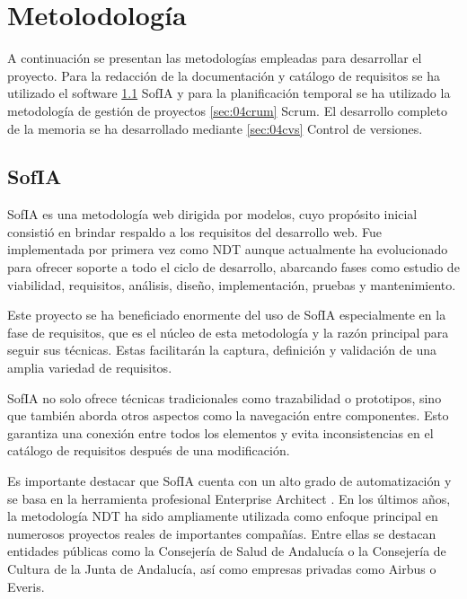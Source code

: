 \chapter{Metolodología}\label{cap:04metodologia}

A continuación se presentan las metodologías empleadas para desarrollar el proyecto. Para la redacción de la documentación y catálogo de requisitos se ha utilizado el software \ref{sec:04sofia} SofIA y para la planificación temporal se ha utilizado la metodología de gestión de proyectos \ref{sec:04crum} Scrum. El desarrollo completo de la memoria se ha desarrollado mediante \ref{sec:04cvs} Control de versiones.


\section{SofIA} \label{sec:04sofia} %

SofIA \cite{escalona2023} es una metodología web dirigida por modelos, cuyo propósito inicial consistió en brindar respaldo a los requisitos del desarrollo web. Fue implementada por primera vez como NDT aunque actualmente ha evolucionado para ofrecer soporte a todo el ciclo de desarrollo, abarcando fases como estudio de viabilidad, requisitos, análisis, diseño, implementación, pruebas y mantenimiento.

Este proyecto se ha beneficiado enormente del uso de SofIA especialmente en la fase de requisitos, que es el núcleo de esta metodología y la razón principal para seguir sus técnicas. Estas facilitarán la captura, definición y validación de una amplia variedad de requisitos.

SofIA no solo ofrece técnicas tradicionales como trazabilidad o prototipos, sino que también aborda otros aspectos como la navegación entre componentes. Esto garantiza una conexión entre todos los elementos y evita inconsistencias en el catálogo de requisitos después de una modificación.

Es importante destacar que SofIA cuenta con un alto grado de automatización y se basa en la herramienta profesional Enterprise Architect \cite{licenciaEA}. En los últimos años, la metodología NDT ha sido ampliamente utilizada como enfoque principal en numerosos proyectos reales de importantes compañías. Entre ellas se destacan entidades públicas como la Consejería de Salud de Andalucía o la Consejería de Cultura de la Junta de Andalucía, así como empresas privadas como Airbus o Everis. 

